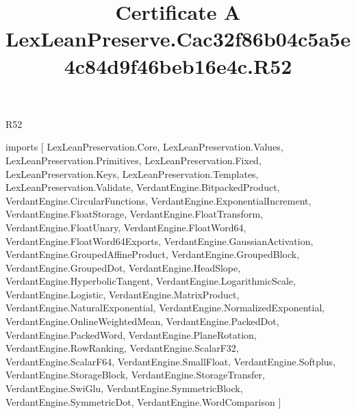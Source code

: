 \begin{lexlean}{R52}
\title{Certificate A LexLeanPreserve.Cac32f86b04c5a5e4c84d9f46beb16e4c.R52}
\begin{coremodule}
imports [
  LexLeanPreservation.Core,
  LexLeanPreservation.Values,
  LexLeanPreservation.Primitives,
  LexLeanPreservation.Fixed,
  LexLeanPreservation.Keys,
  LexLeanPreservation.Templates,
  LexLeanPreservation.Validate,
  VerdantEngine.BitpackedProduct,
  VerdantEngine.CircularFunctions,
  VerdantEngine.ExponentialIncrement,
  VerdantEngine.FloatStorage,
  VerdantEngine.FloatTransform,
  VerdantEngine.FloatUnary,
  VerdantEngine.FloatWord64,
  VerdantEngine.FloatWord64Exports,
  VerdantEngine.GaussianActivation,
  VerdantEngine.GroupedAffineProduct,
  VerdantEngine.GroupedBlock,
  VerdantEngine.GroupedDot,
  VerdantEngine.HeadSlope,
  VerdantEngine.HyperbolicTangent,
  VerdantEngine.LogarithmicScale,
  VerdantEngine.Logistic,
  VerdantEngine.MatrixProduct,
  VerdantEngine.NaturalExponential,
  VerdantEngine.NormalizedExponential,
  VerdantEngine.OnlineWeightedMean,
  VerdantEngine.PackedDot,
  VerdantEngine.PackedWord,
  VerdantEngine.PlaneRotation,
  VerdantEngine.RowRanking,
  VerdantEngine.ScalarF32,
  VerdantEngine.ScalarF64,
  VerdantEngine.SmallFloat,
  VerdantEngine.Softplus,
  VerdantEngine.StorageBlock,
  VerdantEngine.StorageTransfer,
  VerdantEngine.SwiGlu,
  VerdantEngine.SymmetricBlock,
  VerdantEngine.SymmetricDot,
  VerdantEngine.WordComparison
]


\end{coremodule}
\end{lexlean}
